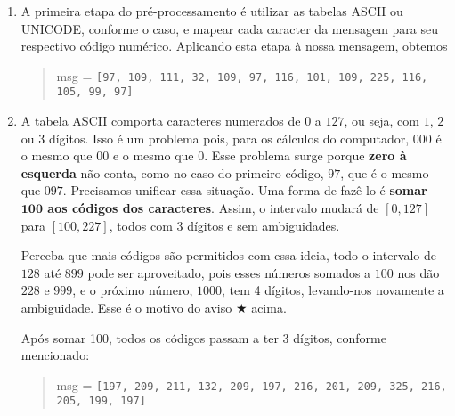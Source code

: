 \documentclass[12pt,a4paper]{article}
\begin{document}
\begin{enumerate}
\item A primeira etapa do pré-processamento é utilizar as tabelas ASCII ou UNICODE, conforme o caso, e mapear cada caracter da mensagem para seu respectivo código numérico. Aplicando esta etapa à nossa mensagem, obtemos
\begin{quote}
msg = {\color{red}\verb|[97, 109, 111, 32, 109, 97, 116, 101, 109, 225, 116, 105, 99, 97]|}
\end{quote}

\item A tabela ASCII comporta caracteres numerados de $0$ a $127$, ou seja, com $1$, $2$ ou $3$ dígitos. Isso é um problema pois, para os cálculos do computador, {\color{red}$000$} é o mesmo que {\color{red}$00$} e o mesmo que {\color{red}$0$}. Esse problema surge porque {\bf zero à esquerda} não conta, como no caso do primeiro código, $97$, que é o mesmo que $097$. Precisamos unificar essa situação. Uma forma de fazê-lo é {\bf somar $\mathbf{100}$ aos códigos dos caracteres}. Assim, o intervalo mudará de $[0,127]$ para $[100,227]$, todos com 3 dígitos e sem ambiguidades. 

Perceba que mais códigos são permitidos com essa ideia, todo o intervalo de $128$ até $899$ pode ser aproveitado, pois esses números somados a $100$ nos dão $228$ e $999$, e o próximo número, $1000$, tem 4 dígitos, levando-nos  novamente a ambiguidade. Esse é o motivo do aviso $\bigstar$ acima.

Após somar 100, todos os códigos passam a ter 3 dígitos, conforme mencionado:
\begin{quote}
msg = {\color{red}\verb|[197, 209, 211, 132, 209, 197, 216, 201, 209, 325, 216, 205, 199, 197]|}
\end{quote}


\end{enumerate}
\end{document}
